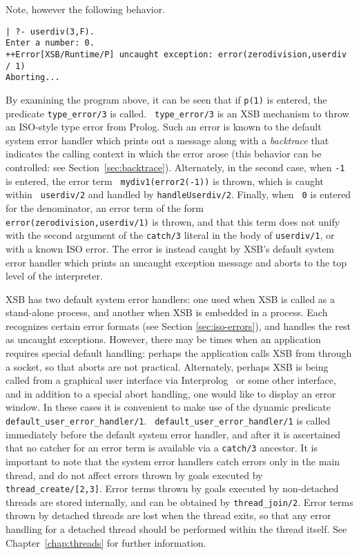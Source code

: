 \noindent
Note, however the following behavior.

\begin{small}
\begin{verbatim}
| ?- userdiv(3,F).
Enter a number: 0.
++Error[XSB/Runtime/P] uncaught exception: error(zerodivision,userdiv / 1)
Aborting...
\end{verbatim}
\end{small}

\noindent
By examining the program above, it can be seen that if {\tt p(1)} is
entered, the predicate {\tt type\_error/3} is called.  {\tt
  type\_error/3} is an XSB mechanism to throw an ISO-style type error
from Prolog.  Such an error is known to the default system error
handler which prints out a message along with a {\em backtrace} that
indicates the calling context in which the error arose (this behavior
can be controlled: see Section~\ref{sec:backtrace}).  Alternately, in
the second case, when {\tt -1} is entered, the error term {\tt
  mydiv1(error2(-1))} is thrown, which is caught within {\tt
  userdiv/2} and handled by {\tt handleUserdiv/2}.  Finally, when {\tt
  0} is entered for the denominator, an error term of the form {\tt
  error(zerodivision,userdiv/1)} is thrown, and that this term does
not unify with the second argument of the {\tt catch/3} literal in the
body of {\tt userdiv/1}, or with a known ISO error.  The error is
instead caught by XSB's default system error handler which prints an
uncaught exception message and aborts to the top level of the
interpreter.

XSB has two default system error handlers: one used when XSB is called
as a stand-alone process, and another when XSB is embedded in a
process.  Each recognizes certain error formats (see Section
\ref{sec:iso-errors}), and handles the rest as uncaught exceptions.
However, there may be times when an application requires special
default handling: perhaps the application calls XSB from through a
socket, so that aborts are not practical.  Alternately, perhaps XSB is
being called from a graphical user interface via
Interprolog~\cite{Cale01} or some other interface, and in addition to
a special abort handling, one would like to display an error window.
In these cases it is convenient to make use of the dynamic predicate
{\tt default\_user\_error\_handler/1}.  {\tt
  default\_user\_error\_handler/1} is called immediately before the
default system error handler, and after it is ascertained that no
catcher for an error term is available via a {\tt catch/3} ancestor.
It is important to note that the system error handlers catch errors
only in the main thread, and do not affect errors thrown by goals
executed by {\tt thread\_create/[2,3]}.  Error terms thrown by goals
executed by non-detached threads are stored internally, and can be
obtained by {\tt thread\_join/2}.  Error terms thrown by detached
threads are lost when the thread exits, so that any error handling for
a detached thread should be performed within the thread itself.  See
Chapter~\ref{chap:threads} for further information.


